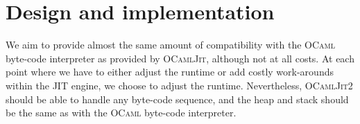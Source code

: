 \documentclass[a4paper]{acm_proc_article-sp}
\begin{document}






\section{Design and implementation} \label{section:Design_and_implementation}

We aim to provide almost the same amount of compatibility with the \textsc{OCaml} byte-code interpreter
as provided by \textsc{OCamlJit}, although not at all costs. At each point where we have to either
adjust the runtime or add costly work-arounds within the JIT engine, we choose to adjust the
runtime. Nevertheless, \textsc{OCamlJit2} should be able to handle any byte-code sequence, and the
heap and stack should be the same as with the \textsc{OCaml} byte-code interpreter.
\end{document}
